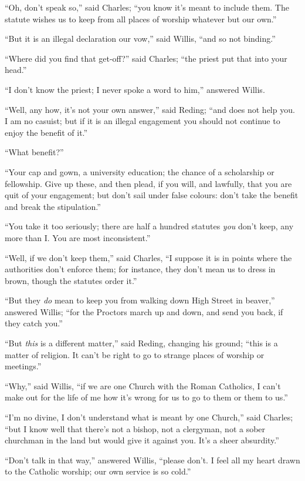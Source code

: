 ``Oh, don't speak so,'' said Charles; ``you know it's
meant to include them. The statute wishes us to keep from all places
of worship whatever but our own.''

``But it is an illegal declaration our vow,'' said Willis,
``and so not binding.''

``Where did you find that get-off?'' said Charles;
``the priest put that into your head.''

``I don't know the priest; I never spoke a word to him,''
answered Willis.

``Well, any how, it's not your own answer,'' said Reding;
``and does not help you. I am no casuist; but if it is an illegal
engagement you should not continue to enjoy the benefit of it.''

``What benefit?''

``Your cap and gown, a university education; the chance of a
scholarship or fellowship. Give up these, and then plead, if you will,
and lawfully, that you are quit of your engagement; but don't sail
under false colours: don't take the benefit and break the
stipulation.''

``You take it too seriously; there are half a hundred statutes \emph{you} don't keep, any more than I. You are most inconsistent.''

``Well, if we don't keep them,'' said Charles, ``I
suppose it is in points where the authorities don't enforce them; for
instance, they don't mean us to dress in brown, though the statutes
order it.''

``But they \emph{do} mean to keep you from walking down High
Street in beaver,'' answered Willis; ``for the Proctors march
up and down, and send you back, if they catch you.''

``But \emph{this} is a different matter,'' said Reding,
changing his ground; ``this is a matter of religion. It can't be
right to go to strange places of worship or meetings.''

``Why,'' said Willis, ``if we are one Church with the
Roman Catholics, I can't make out for the life of me how it's wrong
for us to go to them or them to us.''

``I'm no divine, I don't understand what is meant by one
Church,'' said Charles; ``but I know well that there's not a
bishop, not a clergyman, not a sober churchman in the land but would
give it against you. It's a sheer absurdity.''

``Don't talk in that way,'' answered Willis, ``please
don't. I feel all my heart drawn to the Catholic worship; our own
service is so cold.''

